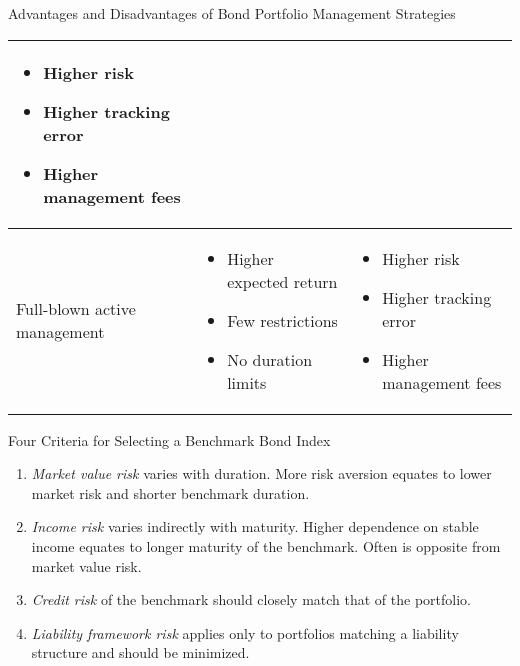 \documentclass[../custom]{flashcards}
\begin{document}
\begin{flashcard}{Advantages and Disadvantages of Bond Portfolio Management Strategies}
\begin{tabular}{>{\raggedright}p{1in} p{1.6in}  p{1.6in}}
\begin{itemize}[nolistsep,leftmargin=*]
            \item Higher risk
            \item Higher tracking error
            \item Higher management fees
            \vspace*{-\baselineskip}
        \end{itemize}
        \\ \midrule
        Full-blown active management &
        \vspace{-3mm}
        \begin{itemize}[nolistsep,leftmargin=*]
            \item Higher expected return
            \item Few restrictions
            \item No duration limits
            \vspace*{-\baselineskip}
        \end{itemize} &
        \vspace{-3mm}
        \begin{itemize}[nolistsep,leftmargin=*]
            \item Higher risk
            \item Higher tracking error
            \item Higher management fees
            \vspace*{-2\baselineskip}
        \end{itemize}
        \\ \bottomrule 
    \end{tabular}
\end{flashcard}

\begin{flashcard}{Four Criteria for Selecting a Benchmark Bond Index}
    \begin{enumerate}
        \item \textit{Market value risk} varies with duration. More risk aversion equates to lower market risk and shorter benchmark duration.
        \item \textit{Income risk} varies indirectly with maturity. Higher dependence on stable income equates to longer maturity of the benchmark. Often is opposite from market value risk.
        \item \textit{Credit risk} of the benchmark should closely match that of the portfolio.
        \item \textit{Liability framework risk} applies only to portfolios matching a liability structure and should be minimized.
    \end{enumerate}
\end{flashcard}
\end{document}
